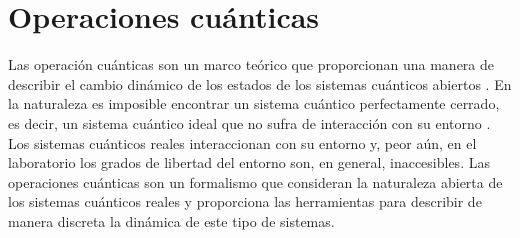 \chapter{Operaciones cuánticas} \label{ch2}

Las operación cuánticas son un marco teórico que proporcionan
una manera de describir el cambio dinámico de los estados 
de los sistemas cuánticos abiertos \cite{bengtsson_zyczkowski_2017}. 
En la naturaleza es imposible
encontrar un sistema cuántico perfectamente cerrado, es decir, un 
sistema cuántico ideal que no sufra de interacción con su entorno
\cite{nielsen_chuang_2011}. Los sistemas cuánticos reales 
interaccionan con su entorno y, peor aún, en el laboratorio 
los grados de libertad del entorno son, en general, inaccesibles.
Las operaciones cuánticas son un formalismo que consideran
la naturaleza abierta de los sistemas cuánticos reales y proporciona
las herramientas para describir de manera discreta la dinámica
de este tipo de sistemas.

